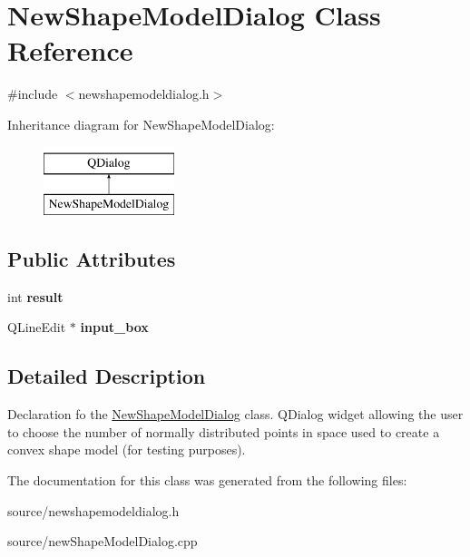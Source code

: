 \hypertarget{class_new_shape_model_dialog}{}\section{New\+Shape\+Model\+Dialog Class Reference}
\label{class_new_shape_model_dialog}


{\ttfamily \#include $<$newshapemodeldialog.\+h$>$}

Inheritance diagram for New\+Shape\+Model\+Dialog\+:\begin{figure}[H]
\begin{center}
\leavevmode
\includegraphics[height=2.000000cm]{class_new_shape_model_dialog}
\end{center}
\end{figure}
\subsection*{Public Attributes}
\begin{DoxyCompactItemize}
\item 
int {\bfseries result}\hypertarget{class_new_shape_model_dialog_acbc0ee2cc93250045f7a1daf7c529de7}{}\label{class_new_shape_model_dialog_acbc0ee2cc93250045f7a1daf7c529de7}

\item 
Q\+Line\+Edit $\ast$ {\bfseries input\+\_\+box}\hypertarget{class_new_shape_model_dialog_abe6e49d9fd8f520ad50aad134ab405c2}{}\label{class_new_shape_model_dialog_abe6e49d9fd8f520ad50aad134ab405c2}

\end{DoxyCompactItemize}


\subsection{Detailed Description}
Declaration fo the \hyperlink{class_new_shape_model_dialog}{New\+Shape\+Model\+Dialog} class. Q\+Dialog widget allowing the user to choose the number of normally distributed points in space used to create a convex shape model (for testing purposes). 

The documentation for this class was generated from the following files\+:\begin{DoxyCompactItemize}
\item 
source/newshapemodeldialog.\+h\item 
source/new\+Shape\+Model\+Dialog.\+cpp\end{DoxyCompactItemize}
